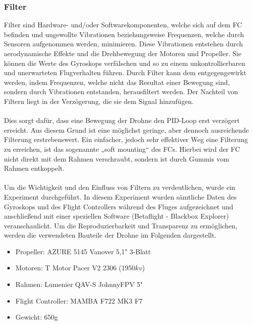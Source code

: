        \newpage
        \subsubsection[Filter]{Filter}
        Filter sind Hardware- und/oder Softwarekomponenten, welche sich auf dem FC befinden und
        ungewollte Vibrationen beziehungsweise Frequenzen, welche durch Sensoren aufgenommen werden,
        minimieren. Diese Vibrationen entstehen durch aerodynamische Effekte und die Drehbewegung
        der Motoren und Propeller. Sie können die Werte des Gyroskops verfälschen und so zu einem
        unkontrollierbaren und unerwarteten Flugverhalten führen. Durch Filter kann dem entgegengewirkt
        werden, indem Frequenzen, welche nicht das Resultat einer Bewegung sind, sondern durch Vibrationen
        entstanden, herausfiltert werden. Der Nachteil von Filtern liegt in der Verzögerung, die sie
        dem Signal hinzufügen.\\
        \\
        Dies sorgt dafür, dass eine Bewegung der Drohne den PID-Loop erst verzögert
        erreicht. Aus diesem Grund ist eine möglichst geringe, aber dennoch ausreichende Filterung
        erstrebenswert. Ein einfacher, jedoch sehr effektiver Weg eine Filterung zu erreichen, ist das
        sogenannte „soft mounting“ des FCs. Hierbei wird der FC nicht direkt mit dem Rahmen verschraubt,
        sondern ist durch Gummis vom Rahmen entkoppelt. \\
        \\
        Um die Wichtigkeit und den Einfluss von Filtern zu verdeutlichen, wurde ein Experiment durchgeführt.
        In diesem Experiment wurden sämtliche Daten des Gyroskops und des Flight Controllers während des Fluges
        aufgezeichnet und anschließend mit einer speziellen Software (Betaflight - Blackbox Explorer)
        veranschaulicht. Um die Reproduzierbarkeit und Transparenz zu ermöglichen, werden die verwendeten
        Bauteile der Drohne im Folgenden dargestellt. \\

        \begin{itemize}
            \item[] Propeller: AZURE 5145 Vanover 5,1" 3-Blatt
            \item[] Motoren: T Motor Pacer V2 2306 (1950$kv$)
            \item[] Rahmen: Lumenier QAV-S JohnnyFPV 5"
            \item[] Flight Controller: MAMBA F722 MK3 F7
            \item[] Gewicht: 650g
        \end{itemize}
        \vspace{0.5cm}


